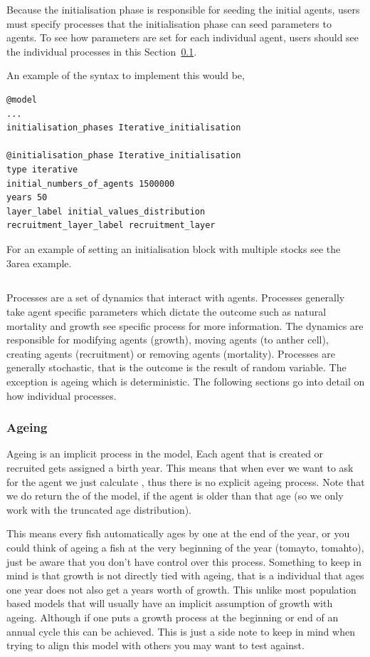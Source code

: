 Because the initialisation phase is responsible for seeding the initial agents, users must specify processes that the initialisation phase can seed parameters to agents. To see how parameters are set for each individual agent, users should see the individual processes in this Section~\ref{sec:process}.

An example of the syntax to implement this would be,
{\small{\begin{verbatim}
@model
...
initialisation_phases Iterative_initialisation

@initialisation_phase Iterative_initialisation
type iterative
initial_numbers_of_agents 1500000
years 50
layer_label initial_values_distribution
recruitment_layer_label recruitment_layer
\end{verbatim}}}

For an example of setting an initialisation block with multiple stocks see the 3area example.


\subsection{}\label{sec:process}
Processes are a set of dynamics that interact with agents. Processes generally take agent specific parameters which dictate the outcome such as natural mortality and growth see specific process for more information. The dynamics are responsible for modifying agents (growth), moving agents (to anther cell), creating agents (recruitment) or removing agents (mortality). Processes are generally stochastic, that is the outcome is the result of random variable. The exception is ageing which is deterministic. The following sections go into detail on how individual processes.

\subsubsection{Ageing}

Ageing is an implicit process in the model, Each agent that is created or recruited gets assigned a birth year. This means that when ever we want to ask for the agent we just calculate , thus there is no explicit ageing process. Note that we do return the  of the model, if the agent is older than that age (so we only work with the truncated age distribution).


This means every fish automatically ages by one at the end of the year, or you could think of ageing a fish at the very beginning of the year (tomayto, tomahto), just be aware that you don't have control over this process. Something to keep in mind is that growth is not directly tied with ageing, that is a individual that ages one year does not also get a years worth of growth. This unlike most population based models that will usually have an implicit assumption of growth with ageing. Although if one puts a growth process at the beginning or end of an annual cycle this can be achieved. This is just a side note to keep in mind when trying to align this model with others you may want to test against.


